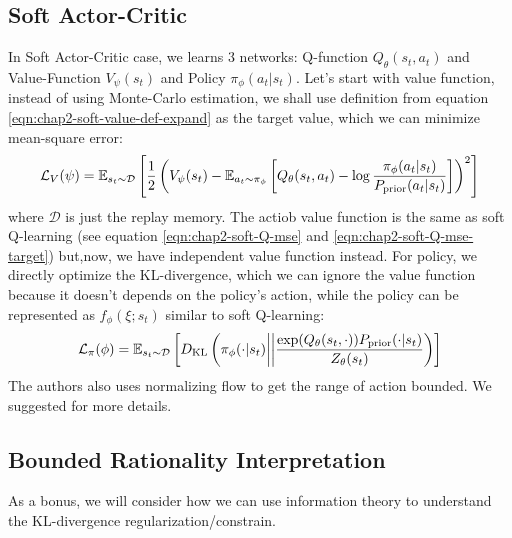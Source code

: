 \subsection{Soft Actor-Critic}
\label{sec:chap2-soft-ac-implement}

In Soft Actor-Critic case, we learns 3 networks: Q-function $Q_{\theta} (s_t, a_t)$ and Value-Function $V_{\psi}(s_t)$ and Policy $\pi_{\phi}(a_t | s_t)$. Let's start with value function, instead of using Monte-Carlo estimation, we shall use definition from equation \ref{eqn:chap2-soft-value-def-expand} as the target value, which we can minimize mean-square error:
\begin{equation}
    \mathcal{L}_V(\psi) = \mathbb{E}_{s_t \sim \mathcal{D}} \left[ \frac{1}{2} \left( V_{\psi}(s_t) - \mathbb{E}_{a_t \sim \pi_{\phi}}\left[ Q_{\theta}(s_t, a_t) - \log \frac{\pi_{\phi}(a_t | s_t)}{P_{\text{prior}}(a_t | s_t)} \right] \right)^2 \right]
\end{equation}
where $\mathcal{D}$ is just the replay memory. The actiob value function is the same as soft Q-learning (see equation \ref{eqn:chap2-soft-Q-mse} and \ref{eqn:chap2-soft-Q-mse-target}) but,now, we have independent value function instead. For policy, we directly optimize the KL-divergence, which we can ignore the value function because it doesn't depends on the policy's action, while the policy can be represented as $f_\phi(\xi ; s_t)$ similar to soft Q-learning:
\begin{equation}
    \mathcal{L}_{\pi}(\phi) = \mathbb{E}_{s_t \sim \mathcal{D}} \left[ D_{\mathrm{KL}}\left( \pi_{\phi}(\cdot | s_t) \bigg| \bigg| \frac{\exp(Q_{\theta}(s_t, \cdot)) P_{\text{prior}}(\cdot | s_t)}{Z_{\theta}(s_t)} \right) \right]
\end{equation}
The authors also uses normalizing flow to get the range of action bounded. We suggested \cite{haarnoja2018softa} for more details.

\subsection{Bounded Rationality Interpretation}
As a bonus, we will consider how we can use information theory to understand the KL-divergence regularization/constrain. 